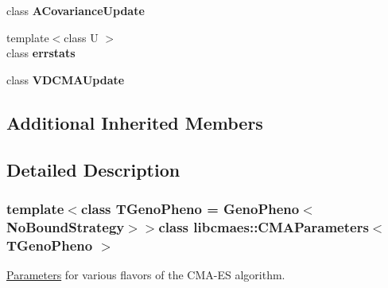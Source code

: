 \begin{DoxyCompactItemize}
\item 
\hypertarget{classlibcmaes_1_1CMAParameters_a81af003765a6521a192e5a37612c2fb5}{class {\bfseries A\-Covariance\-Update}}\label{classlibcmaes_1_1CMAParameters_a81af003765a6521a192e5a37612c2fb5}

\item 
\hypertarget{classlibcmaes_1_1CMAParameters_a867bde5f83097a4db1f667a3911efbae}{{\footnotesize template$<$class U $>$ }\\class {\bfseries errstats}}\label{classlibcmaes_1_1CMAParameters_a867bde5f83097a4db1f667a3911efbae}

\item 
\hypertarget{classlibcmaes_1_1CMAParameters_a3fceefe6a1e378ff9fef5d97117e5f47}{class {\bfseries V\-D\-C\-M\-A\-Update}}\label{classlibcmaes_1_1CMAParameters_a3fceefe6a1e378ff9fef5d97117e5f47}

\end{DoxyCompactItemize}
\subsection*{Additional Inherited Members}


\subsection{Detailed Description}
\subsubsection*{template$<$class T\-Geno\-Pheno = Geno\-Pheno$<$\-No\-Bound\-Strategy$>$$>$class libcmaes\-::\-C\-M\-A\-Parameters$<$ T\-Geno\-Pheno $>$}

\hyperlink{classlibcmaes_1_1Parameters}{Parameters} for various flavors of the C\-M\-A-\/\-E\-S algorithm. 

